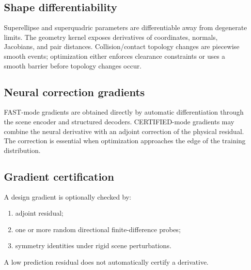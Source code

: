 \subsection{Shape differentiability}

Superellipse and superquadric parameters are differentiable away from
degenerate limits. The geometry kernel exposes derivatives of coordinates,
normals, Jacobians, and pair distances. Collision/contact topology changes are
piecewise smooth events; optimization either enforces clearance constraints or
uses a smooth barrier before topology changes occur.

\subsection{Neural correction gradients}

FAST-mode gradients are obtained directly by automatic differentiation through
the scene encoder and structured decoders. CERTIFIED-mode gradients may combine
the neural derivative with an adjoint correction of the physical residual.
The correction is essential when optimization approaches the edge of the
training distribution.

\subsection{Gradient certification}

A design gradient is optionally checked by:
\begin{enumerate}
\item adjoint residual;
\item one or more random directional finite-difference probes;
\item symmetry identities under rigid scene perturbations.
\end{enumerate}
A low prediction residual does not automatically certify a derivative.
